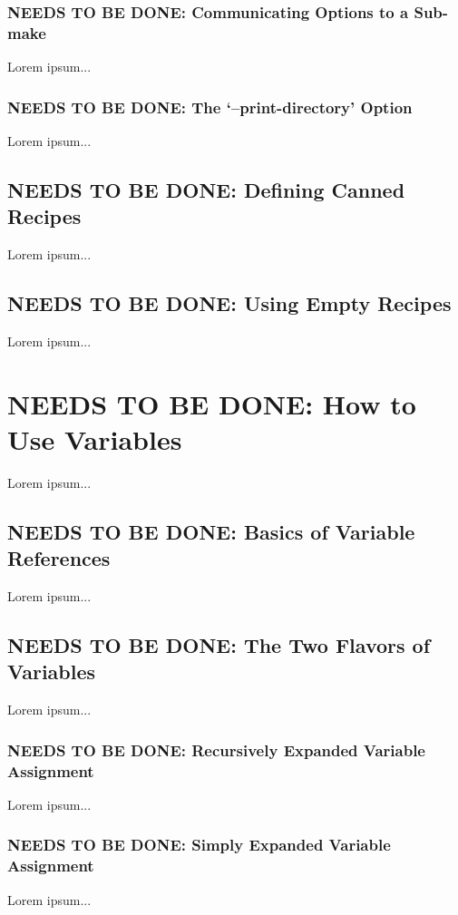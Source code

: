 \documentclass{charun}
\begin{document}
\begin{multicols*}{2}
\color{gray}
\subsubsection{NEEDS TO BE DONE: Communicating Options to a Sub-make}
Lorem ipsum...
\color{black}

\color{gray}
\subsubsection{NEEDS TO BE DONE: The ‘--print-directory’ Option}
Lorem ipsum...
\color{black}

\color{gray}
\subsection{NEEDS TO BE DONE: Defining Canned Recipes}
Lorem ipsum...
\color{black}

\color{gray}
\subsection{NEEDS TO BE DONE: Using Empty Recipes}
Lorem ipsum...
\color{black}


\color{gray}
\section{NEEDS TO BE DONE: How to Use Variables}
Lorem ipsum...
\color{black}


\color{gray}
\subsection{NEEDS TO BE DONE: Basics of Variable References}
Lorem ipsum...
\color{black}

\color{gray}
\subsection{NEEDS TO BE DONE: The Two Flavors of Variables}
Lorem ipsum...
\color{black}

\color{gray}
\subsubsection{NEEDS TO BE DONE: Recursively Expanded Variable Assignment}
Lorem ipsum...
\color{black}

\color{gray}
\subsubsection{NEEDS TO BE DONE: Simply Expanded Variable Assignment}
Lorem ipsum...
\color{black}


\end{multicols*}
\end{document}
